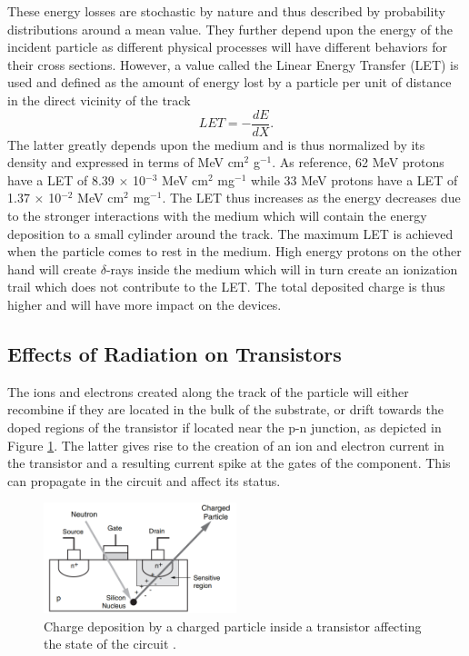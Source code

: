       These energy losses are stochastic by nature and thus described by probability distributions around a mean value. They further depend upon the energy of the incident particle as different physical processes will have different behaviors for their cross sections. However, a value called the Linear Energy Transfer (LET) is used and defined as the amount of energy lost by a particle per unit of distance in the direct vicinity of the track
      \begin{equation}
        LET = - \frac{dE}{dX} .
      \end{equation}
      The latter greatly depends upon the medium and is thus normalized by its density and expressed in terms of MeV cm$^2$ g$^{-1}$. As reference, 62 MeV protons have a LET of 8.39 $\times$ 10$^{-3}$ MeV cm$^2$ mg$^{-1}$ while 33 MeV protons have a LET of 1.37 $\times$ 10$^{-2}$ MeV cm$^2$ mg$^{-1}$. The LET thus increases as the energy decreases due to the stronger interactions with the medium which will contain the energy deposition to a small cylinder around the track. The maximum LET is achieved when the particle comes to rest in the medium. High energy protons on the other hand will create $\delta$-rays inside the medium which will in turn create an ionization trail which does not contribute to the LET. The total deposited charge is thus higher and will have more impact on the devices.

    \subsection{Effects of Radiation on Transistors}

      The ions and electrons created along the track of the particle will either recombine if they are located in the bulk of the substrate, or drift towards the doped regions of the transistor if located near the p-n junction, as depicted in Figure \ref{fig:II-5-transistor}. The latter gives rise to the creation of an ion and electron current in the transistor and a resulting current spike at the gates of the component. This can propagate in the circuit and affect its status. \\

      \begin{figure}[h!]
        \centering
        \includegraphics[width=0.5\textwidth]{img/II-5-irradiation/transistor.png}
        \caption{Charge deposition by a charged particle inside a transistor affecting the state of the circuit \cite{XILINX-RADIATION}.}
        \label{fig:II-5-transistor}
      \end{figure}

